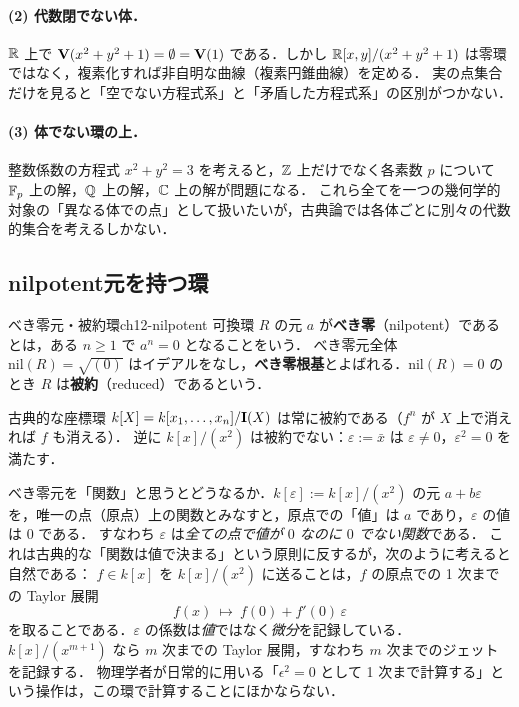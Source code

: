 \paragraph{(2) 代数閉でない体．}
$\mathbb{R}$ 上で $\mathbf{V}(x^2+y^2+1)=\emptyset=\mathbf{V}(1)$ である．しかし $\mathbb{R}[x,y]/(x^2+y^2+1)$ は零環ではなく，複素化すれば非自明な曲線（複素円錐曲線）を定める．
実の点集合だけを見ると「空でない方程式系」と「矛盾した方程式系」の区別がつかない．

\paragraph{(3) 体でない環の上．}
整数係数の方程式 $x^2+y^2=3$ を考えると，$\mathbb{Z}$ 上だけでなく各素数 $p$ について $\mathbb{F}_p$ 上の解，$\mathbb{Q}$ 上の解，$\mathbb{C}$ 上の解が問題になる．
これら全てを一つの幾何学的対象の「異なる体での点」として扱いたいが，古典論では各体ごとに別々の代数的集合を考えるしかない．

\subsection{nilpotent元を持つ環}

\begin{mydef}{べき零元・被約環}{ch12-nilpotent}
可換環 $R$ の元 $a$ が\textbf{べき零}（nilpotent）であるとは，ある $n\ge1$ で $a^n=0$ となることをいう．
べき零元全体 $\mathrm{nil}(R)=\sqrt{(0)}$ はイデアルをなし，\textbf{べき零根基}とよばれる．$\mathrm{nil}(R)=0$ のとき $R$ は\textbf{被約}（reduced）であるという．
\end{mydef}

古典的な座標環 $k[X]=k[x_1,\dots,x_n]/\mathbf{I}(X)$ は常に被約である（$f^n$ が $X$ 上で消えれば $f$ も消える）．
逆に $k[x]/(x^2)$ は被約でない：$\varepsilon:=\bar x$ は $\varepsilon\ne0$，$\varepsilon^2=0$ を満たす．

べき零元を「関数」と思うとどうなるか．$k[\varepsilon]:=k[x]/(x^2)$ の元 $a+b\varepsilon$ を，唯一の点（原点）上の関数とみなすと，原点での「値」は $a$ であり，$\varepsilon$ の値は $0$ である．
すなわち $\varepsilon$ は\emph{全ての点で値が $0$ なのに $0$ でない関数}である．
これは古典的な「関数は値で決まる」という原則に反するが，次のように考えると自然である：
$f\in k[x]$ を $k[x]/(x^2)$ に送ることは，$f$ の原点での 1 次までの Taylor 展開
\[
  f(x)\ \longmapsto\ f(0)+f'(0)\,\varepsilon
\]
を取ることである．$\varepsilon$ の係数は\emph{値}ではなく\emph{微分}を記録している．
$k[x]/(x^{m+1})$ なら $m$ 次までの Taylor 展開，すなわち $m$ 次までのジェットを記録する．
物理学者が日常的に用いる「$\epsilon^2=0$ として 1 次まで計算する」という操作は，この環で計算することにほかならない．


